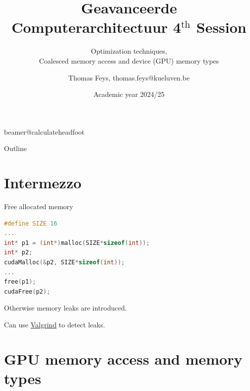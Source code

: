\documentclass[11pt,t]{beamer}
\title[Geavanceerde Computerarchitectuur 4$^{\text{th}}$ Session]{Geavanceerde Computerarchitectuur 4$^{\text{th}}$ Session} %
\subtitle{Optimization techniques, \\ Coalesced memory access and device (GPU) memory types}
\author{Thomas Feys, {\footnotesize thomas.feys@kueluven.be}}
\institute{DRAMCO -- WaveCore -- ESAT}
\date{Academic year 2024/25}
\begin{document}
\csname beamer@calculateheadfoot\endcsname %


\begin{frame}
	\titlepage
\end{frame}
	

\begin{frame}{Outline}
	\hfill	{\large \parbox{.961\textwidth}{\vspace{4mm}\tableofcontents[hideothersubsections]}}
\end{frame}



\section{Intermezzo}

\begin{frame}[fragile]{Free allocated memory}

\begin{lstlisting}[language=C++]
#define SIZE 16
...
int* p1 = (int*)malloc(SIZE*sizeof(int));
int* p2;
cudaMalloc(&p2, SIZE*sizeof(int));
...
free(p1);
cudaFree(p2);
\end{lstlisting}

\vspace{4mm}

Otherwise memory leaks are introduced.

\vspace{2mm}

Can use \href{https://valgrind.org/}{Valgrind} to detect leaks.
    
\end{frame}


\section{GPU memory access and memory types}
\end{document}
